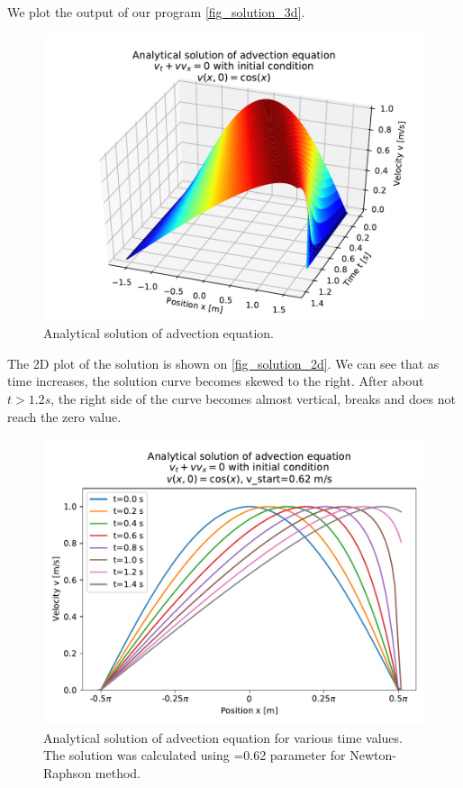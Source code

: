 We plot the output of our program \autoref{fig_solution_3d}.
\begin{figure}[H]
  \centering
  \includegraphics[width=1.0\textwidth]{figures/advection_analytical_solution_3d.pdf}
  \caption{Analytical solution of advection equation.}
  \label{fig_solution_3d}
\end{figure}
The 2D plot of the solution is shown on \autoref{fig_solution_2d}. We can see that as time increases, the solution curve becomes skewed to the right. After about $t > 1.2 s$, the right side of the curve becomes almost vertical, breaks and does not reach the zero value.
\begin{figure}[H]
  \centering
  \includegraphics[width=1.0\textwidth]{figures/advection_analytical_solution_2d_vstart_0_62.pdf}
  \caption{Analytical solution of advection equation for various time values. The solution was calculated using =0.62 parameter for Newton-Raphson method.}
  \label{fig_solution_2d}
\end{figure}
